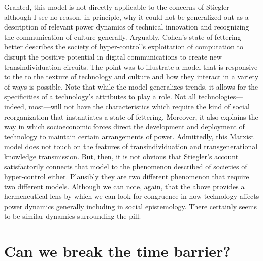 \documentclass[letterpaper,notitlepage,12pt]{article}
\begin{document}
Granted, this model is not directly applicable to the concerns of
Stiegler---although I see no reason, in principle, why it could not be
generalized out as a description of relevant power dynamics of technical
innovation and recognizing the communication of culture generally.
Arguably, Cohen's state of fettering better describes the society of
hyper-control's exploitation of computation to disrupt the positive potential in
digital communications to create new transindividuation circuits.
The point was to illustrate a model that is responsive to the to the texture of
technology and culture and how they interact in a variety of ways is possible.
Note that while the model generalizes trends, it allows for the specificities of
a technology's attributes to play a role.
Not all technologies---indeed, most---will not have the characteristics which
require the kind of social reorganization that instantiates a state of fettering.
Moreover, it also explains the way in which socioeconomic forces direct the
development and deployment of technology to maintain certain arrangements of
power.
Admittedly, this Marxist model does not touch on the features of
transindividuation and transgenerational knowledge transmission.
But, then, it is not obvious that Stiegler's account satisfactorily connects that
model to the phenomenon described of societies of hyper-control either.
Plausibly they are two different phenomenon that require two different models.
Although we can note, again, that the above provides a hermeneutical lens by
which we can look for congruence in how technology affects power dynamics
generally including in social epistemology.
There certainly seems to be similar dynamics surrounding the pill.

\section{Can we break the time barrier?}
\end{document}
